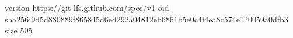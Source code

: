 version https://git-lfs.github.com/spec/v1
oid sha256:9d5d880889f865845d6ed292a04812eb6861b5e0c4f4ea8c574e120059a0dfb3
size 505
